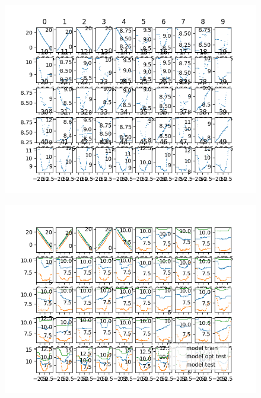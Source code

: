\documentclass{article}
\begin{document}
\newpage

\begin{figure}
\includegraphics[scale=1]{affichage_fonction.png}
\end{figure}

\newpage

\begin{figure}
\includegraphics[scale=1]{affichage_fonction_test.png}
\end{figure}

\newpage
\end{document}
